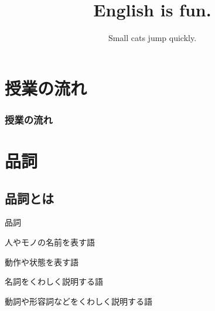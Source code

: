 \documentclass[aspectratio=169,xcolor={dvipsnames,table}]{beamer}
\title{English is fun.}
\subtitle{Small cats jump quickly.}
\author{}
\institute[]{}
\date[]
\begin{document}
\begin{frame}[plain]
  \titlepage
\end{frame}

\section*{授業の流れ}
\begin{frame}[plain]
  \frametitle{授業の流れ}
  \tableofcontents
\end{frame}

\section{品詞}
\subsection{品詞とは}
\begin{frame}[plain]{品詞}
\large 
\begin{description}
 \item<2->[名詞] 人やモノの名前を表す語\hfill{}
 \item<4->[動詞] 動作や状態を表す語\hfill{}
 \item<6->[形容詞] 名詞をくわしく説明する語\hfill{}
 \item<8->[副詞] 動詞や形容詞などをくわしく説明する語\hfill{}
\end{description}

\vfill

\mbox{}\hfill{}
\end{frame}
\end{document}
